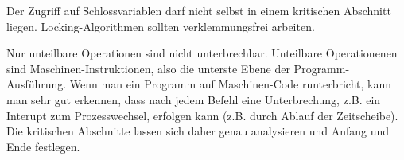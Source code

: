 \begin{answer}
Der Zugriff auf Schlossvariablen darf nicht selbst in einem kritischen Abschnitt liegen. Locking-Algorithmen sollten verklemmungsfrei arbeiten.
\end{answer}

\begin{answer}
Nur unteilbare Operationen sind nicht unterbrechbar. Unteilbare Operationenen sind Maschinen-Instruktionen, also die unterste Ebene der Programm-
Ausführung. Wenn man ein Programm auf Maschinen-Code runterbricht, kann man sehr gut erkennen, dass nach jedem Befehl eine Unterbrechung, z.B. ein Interupt zum Prozesswechsel, erfolgen kann (z.B. durch Ablauf der Zeitscheibe). Die kritischen Abschnitte lassen sich daher genau analysieren und Anfang und Ende festlegen.
\end{answer}

